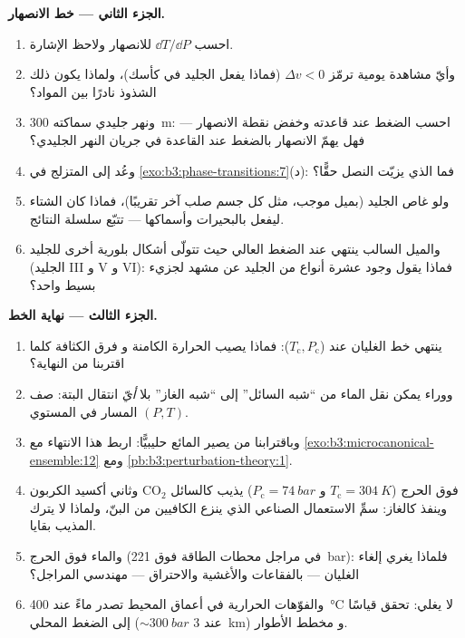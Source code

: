 \begin{problem}
\medskip\noindent\textbf{الجزء الثاني --- خط الانصهار.}
\begin{enumerate}[resume]
  \item احسب $\dd T/\dd P$ للانصهار ولاحظ الإشارة.
  \item وأيّ مشاهدة يومية ترمّز $\Delta v < 0$ (فماذا
        يفعل الجليد في كأسك)، ولماذا يكون ذلك الشذوذ نادرًا
        بين المواد؟
  \item ونهر جليدي سماكته \qty{300}{m}: احسب الضغط عند قاعدته
        وخفض نقطة الانصهار --- فهل يهمّ الانصهار
        بالضغط عند القاعدة في جريان النهر الجليدي؟
  \item وعُد إلى المتزلج في
        \cref{exo:b3:phase-transitions:7}(د): فما الذي يزيّت
        النصل حقًّا؟
  \item ولو غاص الجليد (بميل موجب، مثل كل جسم صلب
        آخر تقريبًا)، فماذا كان الشتاء ليفعل بالبحيرات وأسماكها ---
        تتبّع سلسلة النتائج.
  \item والميل السالب ينتهي عند الضغط العالي حيث تتولّى أشكال
        بلورية أخرى للجليد (الجليد III و V و VI): فماذا يقول
        وجود عشرة أنواع من الجليد عن مشهد 
        لجزيء بسيط واحد؟
\end{enumerate}

\medskip\noindent\textbf{الجزء الثالث --- نهاية الخط.}
\begin{enumerate}[resume]
  \item ينتهي خط الغليان عند ($T_{\text{c}},
        P_{\text{c}}$): فماذا يصيب الحرارة الكامنة و
        فرق الكثافة كلما اقتربنا من النهاية؟
  \item ووراء  يمكن نقل الماء من
        ``شبه السائل'' إلى ``شبه الغاز'' بلا \emph{أيّ} انتقال
        البتة: صف المسار في المستوي $(P, T)$.
  \item وباقترابنا من  يصير المائع حليبيًّا:
        اربط هذا الانتهاء مع
        \cref{exo:b3:microcanonical-ensemble:12} ومع
        \cref{pb:b3:perturbation-theory:1}.
  \item وثاني أكسيد الكربون CO$_2$ فوق الحرج ($T_{\text{c}} = \qty{304}{K}$ و
        $P_{\text{c}} = \qty{74}{bar}$) يذيب كالسائل
        وينفذ كالغاز: سمِّ الاستعمال الصناعي الذي
        ينزع الكافيين من البنّ، ولماذا لا يترك المذيب
        بقايا.
  \item والماء فوق الحرج (في مراجل محطات الطاقة فوق
        \qty{221}{bar}): فلماذا يغري إلغاء الغليان ---
        بالفقاعات والأغشية والاحتراق --- مهندسي المراجل؟
  \item والفوّهات الحرارية في أعماق المحيط تصدر ماءً عند
        \qty{400}{\celsius} لا يغلي: تحقق قياسًا إلى
        الضغط المحلي ($\sim\qty{300}{bar}$ عند \qty{3}{km}) و
        مخطط الأطوار.
\end{enumerate}


\end{problem}
